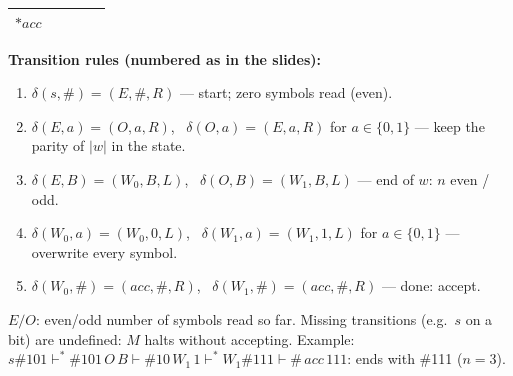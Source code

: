 \documentclass[11pt,a4paper]{article}
\begin{document}
\begin{solution}
\begin{center}
\begin{tabular}{l|cccc}
$*acc$ &  &  &  & \\\bottomrule\end{tabular}\end{center}
\par\noindent\textbf{Transition rules (numbered as in the slides):}
{\small\begin{enumerate}[label=\arabic*.,itemsep=0pt]
\item $\delta(s,\#)=(E,\#,R)$ --- start; zero symbols read (even).
\item $\delta(E,a)=(O,a,R)$, \ $\delta(O,a)=(E,a,R)$ for $a\in\{0,1\}$ --- keep the parity of $|w|$ in the state.
\item $\delta(E,B)=(W_0,B,L)$, \ $\delta(O,B)=(W_1,B,L)$ --- end of $w$: $n$ even / odd.
\item $\delta(W_0,a)=(W_0,0,L)$, \ $\delta(W_1,a)=(W_1,1,L)$ for $a\in\{0,1\}$ --- overwrite every symbol.
\item $\delta(W_0,\#)=(acc,\#,R)$, \ $\delta(W_1,\#)=(acc,\#,R)$ --- done: accept.
\end{enumerate}}
$E/O$: even/odd number of symbols read so far. Missing transitions (e.g.\ $s$ on a bit) are undefined: $M$ halts without accepting. Example: $s\#101\vdash^*\#101\,O\,B\vdash\#10\,W_1\,1\vdash^*W_1\#111\vdash\#\,acc\,111$: ends with \#111 ($n=3$).
\end{solution}
\end{document}
